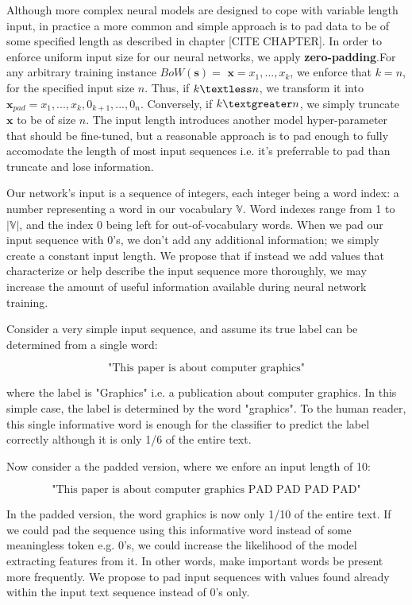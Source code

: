 Although more complex neural models are designed to cope with variable length input,
in practice a more common and simple approach is to pad data to be of some specified
length as described in chapter [CITE CHAPTER].
In order to enforce uniform input size for our neural networks,
we apply \textbf{zero-padding}.For any arbitrary training instance $BoW(\bm{s})=$ $\bm{x} = x_1,...,x_k$, we enforce that $k = n$, for the specified input size
$n$. Thus, if $k \textless n$, we transform it into $\bm{x}_{pad} = x_1,...,x_k, 0_{k+1}, ..., 0_{n}$. Conversely, if
$k \textgreater n$, we simply truncate $\bm{x}$ to be of size $n$. The input length introduces another model hyper-parameter
that should be fine-tuned, but a reasonable approach is to pad enough to fully accomodate
the length of most input sequences i.e. it’s preferrable to pad than truncate and lose
information.

Our network's input is a sequence of integers, each integer being a word index: a number representing a word in our vocabulary $\mathbb{V}$.
Word indexes range from 1 to $|\mathbb{V}|$, and the index 0 being left for out-of-vocabulary words.
When we pad our input sequence with 0’s, we don’t add any additional information; we
simply create a constant input length. We propose that if instead we add values that characterize or help
describe the input sequence more thoroughly, we may increase the amount of useful information
available during neural network training.

Consider a very simple input sequence, and assume its true label can be determined
from a single word:

\[\text{"This paper is about computer graphics"}\]

where the label is "Graphics" i.e. a publication about computer graphics.
In this simple case, the label is determined by the word "graphics". To the human reader, this single informative word
is enough for the classifier to predict the label correctly although it is only 1/6 of the entire text.

Now consider a the padded version, where we enfore an input length of 10:

\[\text{"This paper is about computer graphics PAD PAD PAD PAD"}\]

In the padded version, the word graphics is now only 1/10 of the entire text. If we
could pad the sequence using this informative word instead of some
meaningless token e.g. 0's, we could increase the likelihood of the model extracting features from it. In other
words, make important words be present more frequently.
We propose to pad input sequences with values found already within the
input text sequence instead of 0's only.

